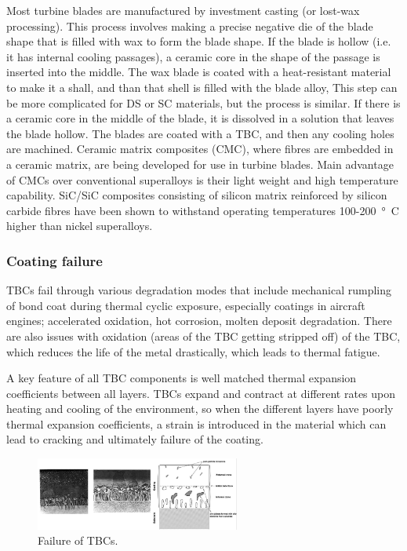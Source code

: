Most turbine blades are manufactured by investment casting (or lost-wax processing). This process involves making a precise negative die of the blade shape that is filled with wax to form the blade shape. If the blade is hollow (i.e. it has internal cooling passages), a ceramic core in the shape of the passage is inserted into the middle. The wax blade is coated with a heat-resistant material to make it a shall, and than that shell is filled with the blade alloy, This step can be more complicated for DS or SC materials, but the process is similar. If there is a ceramic core in the middle of the blade, it is dissolved in a solution that leaves the blade hollow. The blades are coated with a TBC, and then any cooling holes are machined. Ceramic matrix composites (CMC), where fibres are embedded in a ceramic matrix, are being developed for use in turbine blades. Main advantage of CMCs over conventional superalloys is their light weight and high temperature capability. SiC/SiC composites consisting of silicon matrix reinforced by silicon carbide fibres have been shown to withstand operating temperatures 100-\SI{200}{\degree C} higher than nickel superalloys.
\subsubsection{Coating failure}
TBCs fail through various degradation modes that include mechanical rumpling of bond coat during thermal cyclic exposure, especially coatings in aircraft engines; accelerated oxidation, hot corrosion, molten deposit degradation. There are also issues with oxidation (areas of the TBC getting stripped off) of the TBC, which reduces the life of the metal drastically, which leads to thermal fatigue.

A key feature of all TBC components is well matched thermal expansion coefficients between all layers. TBCs expand and contract at different rates upon heating and cooling of the environment, so when the different layers have poorly thermal expansion coefficients, a strain is introduced in the material which can lead to cracking and ultimately failure of the coating.
\begin{figure}[H]
    \centering
    \includegraphics[width =0.6\textwidth]{img/figure30.png}
    \caption{Failure of TBCs.}
\end{figure}
